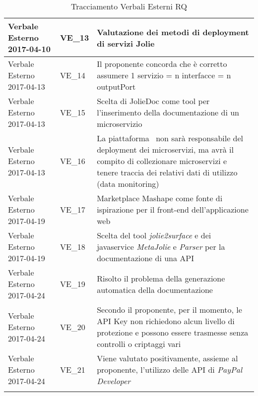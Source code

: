 \begin{longtable}{|>{\centering\arraybackslash}p{4.7cm}|>{\centering\arraybackslash}p{2.5cm} | >{\centering\arraybackslash}p{7cm}|}
			\hline
			Verbale Esterno 2017-04-10 & VE\_13 & Valutazione dei metodi di deployment di servizi Jolie\\
			\hline
			Verbale Esterno 2017-04-13 & VE\_14	&  Il proponente concorda che è corretto assumere 1 servizio = n interfacce = n outputPort \\
			\hline
			Verbale Esterno 2017-04-13 & VE\_15 &  Scelta di JolieDoc come tool per l'inserimento della documentazione di un microservizio \\
			\hline
			Verbale Esterno 2017-04-13 & VE\_16 & La piattaforma \progetto\ non sarà responsabile del deployment dei microservizi, ma avrà il compito di collezionare microservizi e tenere traccia dei relativi dati di utilizzo (data monitoring) \\
			\hline
			Verbale Esterno 2017-04-19 & VE\_17	&  Marketplace Mashape come fonte di ispirazione per il front-end dell'applicazione web \\
			\hline
			Verbale Esterno 2017-04-19 & VE\_18 &  Scelta del tool \textit{jolie2surface} e dei javaservice \textit{MetaJolie} e \textit{Parser} per la documentazione di una API\\
			\hline
			Verbale Esterno 2017-04-24 & VE\_19	&  Risolto il problema della generazione automatica della documentazione \\
			\hline
			Verbale Esterno 2017-04-24 & VE\_20 & Secondo il proponente, per il momento, le API Key non richiedono alcun livello di protezione e possono essere trasmesse senza controlli o criptaggi vari \\
			\hline
			Verbale Esterno 2017-04-24 & VE\_21 & Viene valutato positivamente, assieme al proponente, l'utilizzo delle API di \textit{PayPal Developer} \\
			\hline
			\caption{Tracciamento Verbali Esterni RQ}
\end{longtable}